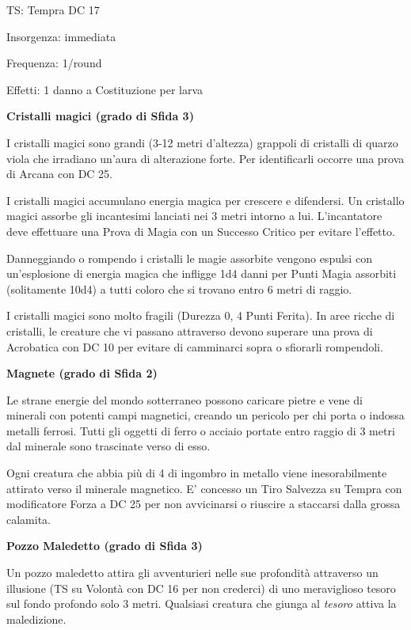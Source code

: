 \begin{multicols}{2}
TS: Tempra DC 17

Insorgenza: immediata

Frequenza: 1/round

Effetti: 1 danno a Costituzione per larva

\medskip
\textbf{Cristalli magici (grado di Sfida 3)}

I cristalli magici sono grandi (3-12 metri d'altezza) grappoli di cristalli di quarzo viola che irradiano un'aura di alterazione forte. Per identificarli occorre una prova di Arcana con DC 25.

I cristalli magici accumulano energia magica per crescere e difendersi. Un cristallo magici assorbe gli incantesimi lanciati nei 3 metri intorno a lui. L'incantatore deve effettuare una Prova di Magia con un Successo Critico per evitare l'effetto.

Danneggiando o rompendo i cristalli le magie assorbite vengono espulsi con un'esplosione di energia magica che infligge 1d4 danni per Punti Magia assorbiti (solitamente 10d4) a tutti coloro che si trovano entro 6 metri di raggio.

I cristalli magici sono molto fragili (Durezza 0, 4 Punti Ferita).
In aree ricche di cristalli, le creature che vi passano attraverso devono superare una prova di Acrobatica con DC 10 per evitare di camminarci sopra o sfiorarli rompendoli.

\medskip
\textbf{Magnete (grado di Sfida 2)}

Le strane energie del mondo sotterraneo possono caricare pietre e vene di minerali con potenti campi magnetici, creando un pericolo per chi porta o indossa metalli ferrosi. Tutti gli oggetti di ferro o acciaio portate entro raggio di 3 metri dal minerale sono trascinate verso di esso.




Ogni creatura che abbia più di 4 di ingombro in metallo viene inesorabilmente attirato verso il minerale magnetico. E' concesso un Tiro Salvezza su Tempra con modificatore Forza a DC 25 per non avvicinarsi o riuscire a staccarsi dalla grossa calamita.

\medskip
\textbf{Pozzo Maledetto (grado di Sfida 3)}

Un pozzo maledetto attira gli avventurieri nelle sue profondità attraverso un illusione (TS su Volontà con DC 16 per non crederci) di uno meraviglioso tesoro sul fondo profondo solo 3 metri. Qualsiasi creatura che giunga al \emph{tesoro} attiva la maledizione.


\end{multicols}

